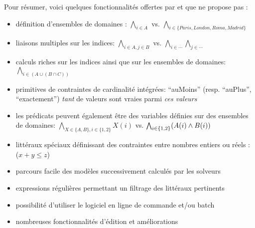 Pour résumer, voici quelques fonctionnalités offertes par \touist et que \satoulouse ne propose pas :
\begin{itemize}
\item définition d'ensembles de domaines : $\bigwedge_{i\in A}$ vs. $\bigwedge_{i\in\{Paris,London,Roma,Madrid\}}$
\item liaisons multiples sur les indices: $\bigwedge_{i\in A,j\in B}$ vs. $\bigwedge_{i\in \cdots} \bigwedge_{j\in \cdots}$
\item calculs riches sur les indices ainsi que sur les ensembles de domaines: $\bigwedge_{i\in (A\cup (B \cap C))}$
\item primitives de contraintes de cardinalité intégrées: ``auMoins'' (resp. ``auPlus'', ``exactement'') \emph{tant} de valeurs sont vraies parmi \emph{ces valeurs}
\item les prédicats peuvent également être des variables définies sur des ensembles de domaines: $\bigwedge_{X\in \{A,B\},i\in \{1,2\}} X(i)$ vs. $\bigwedge_{i\in \{1,2\}} (A(i)\wedge B(i))$
\item littéraux spéciaux définissant des contraintes entre nombres entiers ou réels : ($x+y\leq z$)
\item parcours facile des modèles successivement calculés par les solveurs
\item expressions régulières permettant un filtrage des littéraux pertinents
\item possibilité d'utiliser le logiciel en ligne de commande et/ou batch
\item nombreuses fonctionnalités d'édition et améliorations
\end{itemize}
